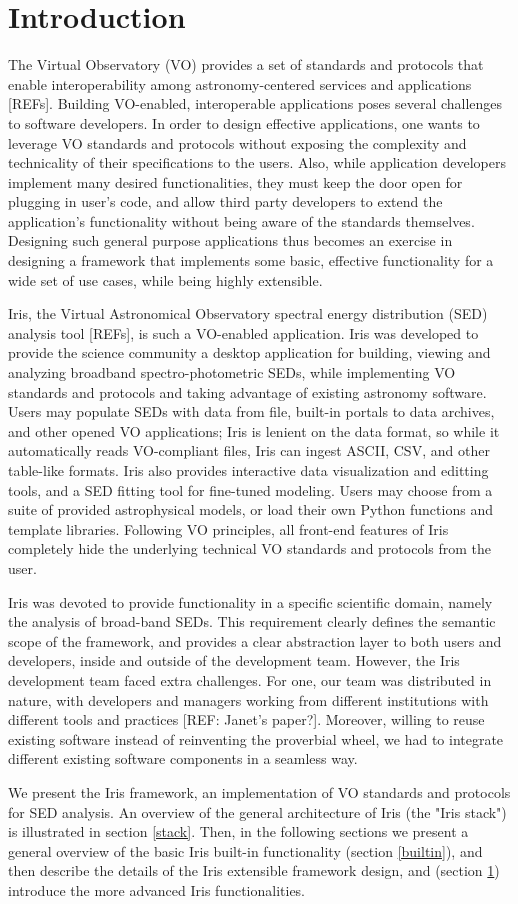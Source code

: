 \section{Introduction} 
The Virtual Observatory (VO) provides a set of standards and protocols that enable interoperability among astronomy-centered services and applications [REFs]. Building VO-enabled, interoperable applications poses several challenges to software developers. In order to design effective applications, one wants to leverage VO standards and protocols without exposing the complexity and technicality of their specifications to the users. Also, while application developers implement many desired functionalities, they must keep the door open for plugging in user's code, and allow third party developers to extend the application's functionality without being aware of the standards themselves. Designing such general purpose applications thus becomes an exercise in designing a framework that implements some basic, effective functionality for a wide set of use cases, while being highly extensible.

Iris, the Virtual Astronomical Observatory spectral energy distribution (SED) analysis tool [REFs], is such a VO-enabled application. Iris was developed to provide the science community a desktop application for building, viewing and analyzing broadband spectro-photometric SEDs, while implementing VO standards and protocols and taking advantage of existing astronomy software. Users may populate SEDs with data from file, built-in portals to data archives, and other opened VO applications; Iris is lenient on the data format, so while it automatically reads VO-compliant files, Iris can ingest ASCII, CSV, and other table-like formats. Iris also provides interactive data visualization and editting tools, and a SED fitting tool for fine-tuned modeling. Users may choose from a suite of provided astrophysical models, or load their own Python functions and template libraries. Following VO principles, all front-end features of Iris completely hide the underlying technical VO standards and protocols from the user.

Iris was devoted to provide functionality in a specific scientific domain, namely the analysis of broad-band SEDs. This requirement clearly defines the semantic scope of the framework, and provides a clear abstraction layer to both users and developers, inside and outside of the development team. However, the Iris development team faced extra challenges. For one, our team was distributed in nature, with developers and managers working from different institutions with different tools and practices [REF: Janet's paper?]. Moreover, willing to reuse existing software instead of reinventing the proverbial wheel, we had to integrate different existing software components in a seamless way.

We present the Iris framework, an implementation of VO standards and protocols for SED analysis. An overview of the general architecture of Iris (the "Iris stack") is illustrated in section \ref{stack}. Then, in the following sections we present a general overview of the basic Iris built-in functionality (section \ref{builtin}), and then describe the details of the Iris extensible framework design, and (section \ref{}) introduce the more advanced Iris functionalities.